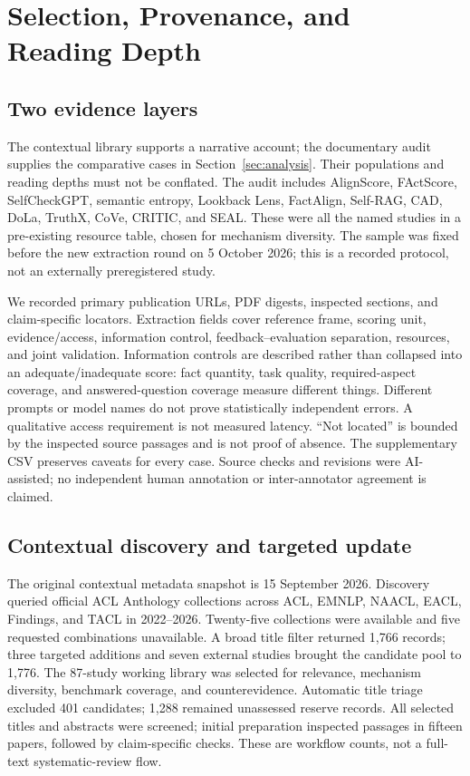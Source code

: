 \section{Selection, Provenance, and Reading Depth}\label{app:selection}
\subsection{Two evidence layers}
The contextual library supports a narrative account; the documentary audit supplies the comparative cases in Section~\ref{sec:analysis}. Their populations and reading depths must not be conflated. The audit includes AlignScore, FActScore, SelfCheckGPT, semantic entropy, Lookback Lens, FactAlign, Self-RAG, CAD, DoLa, TruthX, CoVe, CRITIC, and SEAL. These were all the named studies in a pre-existing resource table, chosen for mechanism diversity. The sample was fixed before the new extraction round on 5 October 2026; this is a recorded protocol, not an externally preregistered study.

We recorded primary publication URLs, PDF digests, inspected sections, and claim-specific locators. Extraction fields cover reference frame, scoring unit, evidence/access, information control, feedback--evaluation separation, resources, and joint validation. Information controls are described rather than collapsed into an adequate/inadequate score: fact quantity, task quality, required-aspect coverage, and answered-question coverage measure different things. Different prompts or model names do not prove statistically independent errors. A qualitative access requirement is not measured latency. ``Not located'' is bounded by the inspected source passages and is not proof of absence. The supplementary CSV preserves caveats for every case. Source checks and revisions were AI-assisted; no independent human annotation or inter-annotator agreement is claimed.

\subsection{Contextual discovery and targeted update}
The original contextual metadata snapshot is 15 September 2026. Discovery queried official ACL Anthology collections across ACL, EMNLP, NAACL, EACL, Findings, and TACL in 2022--2026. Twenty-five collections were available and five requested combinations unavailable. A broad title filter returned 1,766 records; three targeted additions and seven external studies brought the candidate pool to 1,776. The 87-study working library was selected for relevance, mechanism diversity, benchmark coverage, and counterevidence. Automatic title triage excluded 401 candidates; 1,288 remained unassessed reserve records. All selected titles and abstracts were screened; initial preparation inspected passages in fifteen papers, followed by claim-specific checks. These are workflow counts, not a full-text systematic-review flow.

